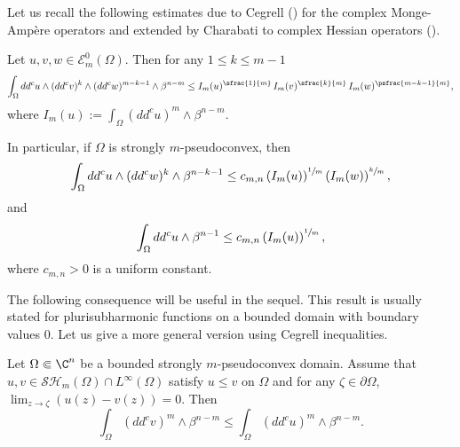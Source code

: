Let us recall the following estimates due to Cegrell (\cite{Ceg04}) for the complex Monge-Ampère operators and extended by Charabati to complex Hessian operators (\cite{Ch16}).

\begin{lemma} \label{lem:Cegrell} Let $u, v, w \in\mathcal{E}_m^0(\Omega)$. Then for any $1 \leq k \leq m - 1$
\[
\int_{\Omega}dd^cu\wedge(dd^cv)^k\wedge(dd^cw)^{m-k-1}\wedge\beta^{n-m}
\leq I_m (u)^{\sfrac{1}{m}} \, I_m (v)^{\sfrac{k}{m}} \, I_m (w)^{\psfrac{m-k-1}{m}},
\]
where $I_m (u):= \int_{\Omega}(dd^c u)^m \wedge \beta^{n-m}$.

In particular, if $\Omega$ is strongly $m$-pseudoconvex, then
\[
\int_{\Omega}dd^c u \wedge (dd^c w)^k \wedge\beta^{n-k -1} \leq c_{m,n} \left(I_m (u)\right)^{\sfrac{1}{m}} \left(I_m (w)\right)^{\sfrac{k}{m}},
\]
and
\[
\int_{\Omega}dd^c u \wedge \beta^{n-1} \leq c_{m,n} \left(I_m (u)\right)^{\sfrac{1}{m}},
\]
where $c_{m,n} > 0$ is a uniform constant.
\end{lemma}

The following consequence will be useful in the sequel. This result is usually stated for plurisubharmonic functions on a bounded domain with boundary values $0$. Let us give a more general version using Cegrell inequalities.

\begin{corollary} \label{coro:comparison principle} Let $\Omega \Subset \C^n$ be a bounded strongly $m$-pseudoconvex domain. Assume that $u,v\in \mathcal{SH}_m(\Omega)\cap L^{\infty}(\Omega)$ satisfy $u \leq v$ on $\Omega$ and for any $\zeta \in \partial \Omega$, $\lim_{z \to \zeta }(u(z)- v(z))= 0$.
Then
\[
\int_{\Omega}(dd^c v)^m\wedge\beta^{n-m} \leq \int_{\Omega}(dd^c u)^m\wedge\beta^{n-m}.
\]
\end{corollary}

